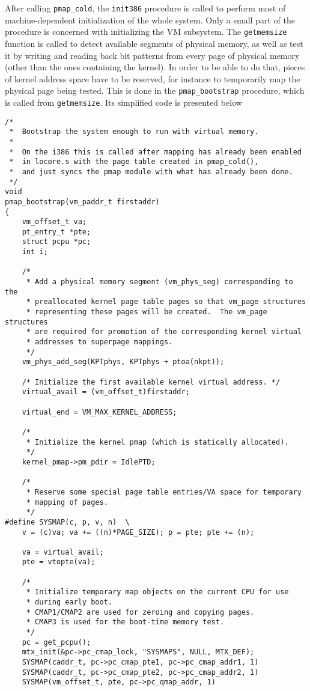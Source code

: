 \documentclass[shortabstract, english]{iithesis}
\newenvironment{code}{}{}
\begin{document}
After calling \texttt{pmap_cold}, the \texttt{init386} procedure
is called to perform most of machine-dependent initialization of the whole
system. Only a small part of the procedure is concerned with initializing the VM
subsystem. The \texttt{getmemsize} function is called to detect available
segments of physical memory, as well as test it by writing and reading back bit
patterns from every page of physical memory (other than the ones containing the
kernel). In order to be able to do that, pieces of kernel address space have to
be reserved, for instance to temporarily map the physical page being tested.
This is done in the \texttt{pmap_bootstrap} procedure, which is called
from \texttt{getmemsize}. Its simplified code is presented below

\begin{code}
\begin{verbatim}
/*
 *  Bootstrap the system enough to run with virtual memory.
 *
 *  On the i386 this is called after mapping has already been enabled
 *  in locore.s with the page table created in pmap_cold(),
 *  and just syncs the pmap module with what has already been done.
 */
void
pmap_bootstrap(vm_paddr_t firstaddr)
{
    vm_offset_t va;
    pt_entry_t *pte;
    struct pcpu *pc;
    int i;

    /*
     * Add a physical memory segment (vm_phys_seg) corresponding to the
     * preallocated kernel page table pages so that vm_page structures
     * representing these pages will be created.  The vm_page structures
     * are required for promotion of the corresponding kernel virtual
     * addresses to superpage mappings.
     */
    vm_phys_add_seg(KPTphys, KPTphys + ptoa(nkpt));

    /* Initialize the first available kernel virtual address. */
    virtual_avail = (vm_offset_t)firstaddr;

    virtual_end = VM_MAX_KERNEL_ADDRESS;

    /*
     * Initialize the kernel pmap (which is statically allocated).
     */
    kernel_pmap->pm_pdir = IdlePTD;

    /*
     * Reserve some special page table entries/VA space for temporary
     * mapping of pages.
     */
#define SYSMAP(c, p, v, n)  \
    v = (c)va; va += ((n)*PAGE_SIZE); p = pte; pte += (n);

    va = virtual_avail;
    pte = vtopte(va);

    /*
     * Initialize temporary map objects on the current CPU for use
     * during early boot.
     * CMAP1/CMAP2 are used for zeroing and copying pages.
     * CMAP3 is used for the boot-time memory test.
     */
    pc = get_pcpu();
    mtx_init(&pc->pc_cmap_lock, "SYSMAPS", NULL, MTX_DEF);
    SYSMAP(caddr_t, pc->pc_cmap_pte1, pc->pc_cmap_addr1, 1)
    SYSMAP(caddr_t, pc->pc_cmap_pte2, pc->pc_cmap_addr2, 1)
    SYSMAP(vm_offset_t, pte, pc->pc_qmap_addr, 1)


\end{verbatim}
\end{code}
\end{document}
